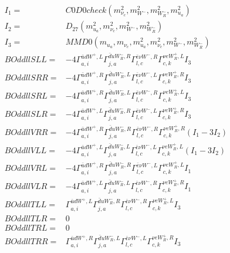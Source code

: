 \documentclass[A4,landscape]{article}
\begin{document}
\begin{align} 
I_1 = & C0D0check(m^2_{\nu_{{c}}}, m^2_{W^-}, m^2_{W_R^-}, m^2_{u_{{a}}}) \\ 
I_2 = & D_{27}(m^2_{u_{{a}}}, m^2_{\nu_{{c}}}, m^2_{W^-}, m^2_{W_R^-}) \\ 
I_3 = & MMD0(m_{u_{{a}}}, m_{\nu_{{c}}}, m^2_{u_{{a}}}, m^2_{\nu_{{c}}}, m^2_{W^-}, m^2_{W_R^-}) \\ 
  BOddllSLL= & -4  \Gamma^{\bar{u}d W^+,L}_{a, i} \Gamma^{\bar{d}u W_R^- ,R}_{j, a} \Gamma^{\bar{e}\nu W^- ,R}_{l, c} \Gamma^{\nu e W_R^+,L}_{c, k} I_3 \\ 
  BOddllSRR= & -4  \Gamma^{\bar{u}d W^+,R}_{a, i} \Gamma^{\bar{d}u W_R^- ,L}_{j, a} \Gamma^{\bar{e}\nu W^- ,L}_{l, c} \Gamma^{\nu e W_R^+,R}_{c, k} I_3 \\ 
  BOddllSRL= & -4  \Gamma^{\bar{u}d W^+,R}_{a, i} \Gamma^{\bar{d}u W_R^- ,L}_{j, a} \Gamma^{\bar{e}\nu W^- ,R}_{l, c} \Gamma^{\nu e W_R^+,L}_{c, k} I_3 \\ 
  BOddllSLR= & -4  \Gamma^{\bar{u}d W^+,L}_{a, i} \Gamma^{\bar{d}u W_R^- ,R}_{j, a} \Gamma^{\bar{e}\nu W^- ,L}_{l, c} \Gamma^{\nu e W_R^+,R}_{c, k} I_3 \\ 
  BOddllVRR= & -4  \Gamma^{\bar{u}d W^+,R}_{a, i} \Gamma^{\bar{d}u W_R^- ,R}_{j, a} \Gamma^{\bar{e}\nu W^- ,R}_{l, c} \Gamma^{\nu e W_R^+,R}_{c, k} (I_1 - 3 I_2) \\ 
  BOddllVLL= & -4  \Gamma^{\bar{u}d W^+,L}_{a, i} \Gamma^{\bar{d}u W_R^- ,L}_{j, a} \Gamma^{\bar{e}\nu W^- ,L}_{l, c} \Gamma^{\nu e W_R^+,L}_{c, k} (I_1 - 3 I_2) \\ 
  BOddllVRL= & -4  \Gamma^{\bar{u}d W^+,R}_{a, i} \Gamma^{\bar{d}u W_R^- ,R}_{j, a} \Gamma^{\bar{e}\nu W^- ,L}_{l, c} \Gamma^{\nu e W_R^+,L}_{c, k} I_1 \\ 
  BOddllVLR= & -4  \Gamma^{\bar{u}d W^+,L}_{a, i} \Gamma^{\bar{d}u W_R^- ,L}_{j, a} \Gamma^{\bar{e}\nu W^- ,R}_{l, c} \Gamma^{\nu e W_R^+,R}_{c, k} I_1 \\ 
  BOddllTLL= &  \Gamma^{\bar{u}d W^+,L}_{a, i} \Gamma^{\bar{d}u W_R^- ,R}_{j, a} \Gamma^{\bar{e}\nu W^- ,R}_{l, c} \Gamma^{\nu e W_R^+,L}_{c, k} I_3 \\ 
  BOddllTLR= & 0 \\ 
  BOddllTRL= & 0 \\ 
  BOddllTRR= &  \Gamma^{\bar{u}d W^+,R}_{a, i} \Gamma^{\bar{d}u W_R^- ,L}_{j, a} \Gamma^{\bar{e}\nu W^- ,L}_{l, c} \Gamma^{\nu e W_R^+,R}_{c, k} I_3 \\ 
\end{align} 
\end{document}
